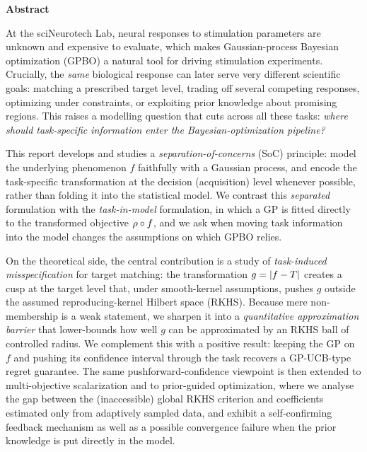 \begin{center}
  {\Large\bfseries Abstract}
\end{center}
\vspace{0.4cm}

\noindent
At the sciNeurotech Lab, neural responses to stimulation parameters are unknown
and expensive to evaluate, which makes Gaussian-process Bayesian optimization
(GPBO) a natural tool for driving stimulation experiments. Crucially, the
\emph{same} biological response can later serve very different scientific goals:
matching a prescribed target level, trading off several competing responses,
optimizing under constraints, or exploiting prior knowledge about promising
regions. This raises a modelling question that cuts across all these tasks:
\emph{where should task-specific information enter the Bayesian-optimization
pipeline?}

This report develops and studies a \emph{separation-of-concerns} (SoC) principle:
model the underlying phenomenon $f$ faithfully with a Gaussian process, and
encode the task-specific transformation at the decision (acquisition) level
whenever possible, rather than folding it into the statistical model. We contrast
this \emph{separated} formulation with the \emph{task-in-model} formulation, in
which a GP is fitted directly to the transformed objective $\rho\circ f$, and we
ask when moving task information into the model changes the assumptions on which
GPBO relies.

On the theoretical side, the central contribution is a study of
\emph{task-induced misspecification} for target matching: the transformation
$g=\left\lvert f-T\right\rvert$ creates a cusp at the target level that, under smooth-kernel
assumptions, pushes $g$ outside the assumed reproducing-kernel Hilbert space
(RKHS). Because mere non-membership is a weak statement, we sharpen it into a
\emph{quantitative approximation barrier} that lower-bounds how well $g$ can be
approximated by an RKHS ball of controlled radius. We complement this with a
positive result: keeping the GP on $f$ and pushing its confidence interval
through the task recovers a GP-UCB-type regret guarantee. The same
pushforward-confidence viewpoint is then extended to multi-objective
scalarization and to prior-guided optimization, where we analyse the gap between
the (inaccessible) global RKHS criterion and coefficients estimated only from
adaptively sampled data, and exhibit a self-confirming feedback mechanism as well as a possible convergence failure when the prior knowledge is put directly in the model.

